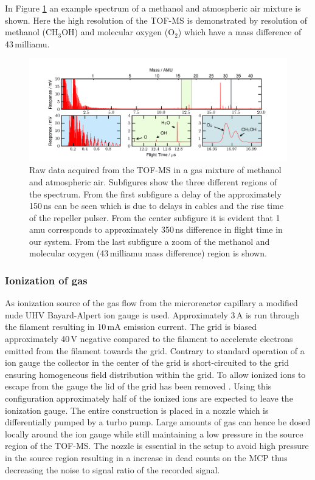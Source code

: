 \documentclass[aip,rsi]{revtex4-1}
\begin{document}
In Figure \ref{fig:untreated_data} an example spectrum of a methanol and atmospheric air mixture is shown. Here the high resolution of the TOF-MS is demonstrated by resolution of methanol (CH$_3$OH) and molecular oxygen (O$_2$) which have a mass difference of 43\,milliamu.
\begin{figure}
 \includegraphics[width=16cm]{untreated_data.png}%
 \caption{Raw data acquired from the TOF-MS in a gas mixture of methanol and atmospheric air. Subfigures show the three different regions of the spectrum. From the first subfigure a delay of the approximately 150\,ns can be seen which is due to delays in cables and the rise time of the repeller pulser. From the center subfigure it is evident that 1\,amu corresponds to approximately 350\,ns difference in flight time in our system. From the last subfigure a zoom of the methanol and molecular oxygen (43\,milliamu mass difference) region is shown.\label{fig:untreated_data}}%
\end{figure}


\subsubsection{Ionization of gas}
As ionization source of the gas flow from the microreactor capillary a modified nude UHV Bayard-Alpert ion gauge is used. Approximately 3\,A is run through the filament resulting in 10\,mA emission current. The grid is biased approximately 40\,V negative compared to the filament to accelerate electrons emitted from the filament towards the grid. Contrary to standard operation of a ion gauge the collector in the center of the grid is short-circuited to the grid ensuring homogeneous field distribution within the grid. To allow ionized ions to escape from the gauge the lid of the grid has been removed \cite{Nottingham1955}. Using this configuration approximately half of the ionized ions are expected to leave the ionization gauge. The entire construction is placed in a nozzle which is differentially pumped by a turbo pump. Large amounts of gas can hence be dosed locally around the ion gauge while still maintaining a low pressure in the source region of the TOF-MS. The nozzle is essential in the setup to avoid high pressure in the source region resulting in a increase in dead counts on the MCP thus decreasing the noise to signal ratio of the recorded signal.
\end{document}
